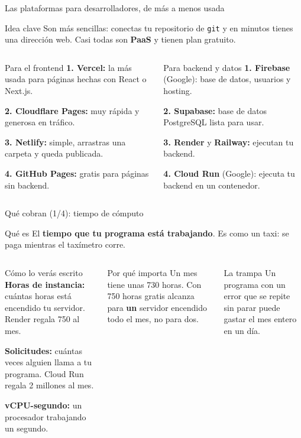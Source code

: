 \documentclass[aspectratio=169,10pt,c]{beamer}
\begin{document}
\begin{frame}{Las plataformas para desarrolladores, de más a menos usada}
\begin{block}{Idea clave}
\small Son más sencillas: conectas tu repositorio de \texttt{git} y en minutos tienes una dirección web. Casi todas son \textbf{PaaS} y tienen plan gratuito.
\end{block}
\begin{columns}[T,onlytextwidth]
\begin{exampleblock}{Para el frontend}
\small
\textbf{1. Vercel:} la más usada para páginas hechas con React o Next.js.\par\smallskip
\textbf{2. Cloudflare Pages:} muy rápida y generosa en tráfico.\par\smallskip
\textbf{3. Netlify:} simple, arrastras una carpeta y queda publicada.\par\smallskip
\textbf{4. GitHub Pages:} gratis para páginas sin backend.
\end{exampleblock}
\begin{exampleblock}{Para backend y datos}
\small
\textbf{1. Firebase} (Google): base de datos, usuarios y hosting.\par\smallskip
\textbf{2. Supabase:} base de datos PostgreSQL lista para usar.\par\smallskip
\textbf{3. Render} y \textbf{Railway:} ejecutan tu backend.\par\smallskip
\textbf{4. Cloud Run} (Google): ejecuta tu backend en un contenedor.
\end{exampleblock}
\end{columns}
\end{frame}

\begin{frame}{Qué cobran (1/4): tiempo de cómputo}
\begin{block}{Qué es}
\small El \textbf{tiempo que tu programa está trabajando}. Es como un taxi: se paga mientras el taxímetro corre.
\end{block}
\begin{columns}[T,onlytextwidth]
\begin{exampleblock}{Cómo lo verás escrito}
\small
\textbf{Horas de instancia:} cuántas horas está encendido tu servidor. Render regala 750 al mes.\par\smallskip
\textbf{Solicitudes:} cuántas veces alguien llama a tu programa. Cloud Run regala 2 millones al mes.\par\smallskip
\textbf{vCPU-segundo:} un procesador trabajando un segundo.
\end{exampleblock}
\begin{block}{Por qué importa}
\small Un mes tiene unas 730 horas. Con 750 horas gratis alcanza para \textbf{un} servidor encendido todo el mes, no para dos.
\end{block}
\begin{alertblock}{La trampa}
\small Un programa con un error que se repite sin parar puede gastar el mes entero en un día.
\end{alertblock}
\end{columns}
\end{frame}
\end{document}
